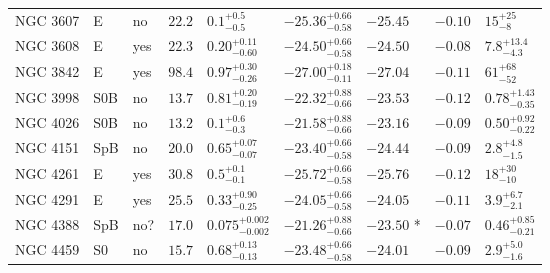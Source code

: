\begin{table*}
\begin{center}
\begin{tabular}{lllllllll}
NGC 3607  &  E  &  no   &  $22.2$  &  $0.1_{-0.5}^{+0.5}$   &  $-25.36_{-0.58}^{+0.66}$   &  $-25.45$   &  $-0.10$  &  $15_{-8}^{+25}$   \\ 
NGC 3608  &  E  &  yes   &  $22.3$  &  $0.20_{-0.60}^{+0.11}$   &  $-24.50_{-0.58}^{+0.66}$   &  $-24.50$   &  $-0.08$  &  $7.8_{-4.3}^{+13.4}$   \\ 
NGC 3842  &  E  &  yes   &  $98.4$  &  $0.97_{-0.26}^{+0.30}$   &  $-27.00_{-0.11}^{+0.18}$   &  $-27.04$   &  $-0.11$  &  $61_{-52}^{+68}$   \\ 
NGC 3998  &  S0B  &  no   &  $13.7$  &  $0.81_{-0.19}^{+0.20}$   &  $-22.32_{-0.66}^{+0.88}$   &  $-23.53$   &  $-0.12$  &  $0.78_{-0.35}^{+1.43}$   \\ 
NGC 4026  &  S0B  &  no   &  $13.2$  &  $0.1_{-0.3}^{+0.6}$   &  $-21.58_{-0.66}^{+0.88}$   &  $-23.16$   &  $-0.09$  &  $0.50_{-0.22}^{+0.92}$   \\ 
NGC 4151  &  SpB  &  no   &  $20.0$  &  $0.65_{-0.07}^{+0.07}$   &  $-23.40_{-0.58}^{+0.66}$   &  $-24.44$   &  $-0.09$  &  $2.8_{-1.5}^{+4.8}$   \\ 
NGC 4261  &  E  &  yes   &  $30.8$  &  $0.5_{-0.1}^{+0.1}$   &  $-25.72_{-0.58}^{+0.66}$   &  $-25.76$   &  $-0.12$  &  $18_{-10}^{+30}$   \\ 
NGC 4291  &  E  &  yes   &  $25.5$  &  $0.33_{-0.25}^{+0.90}$   &  $-24.05_{-0.58}^{+0.66}$   &  $-24.05$   &  $-0.11$  &  $3.9_{-2.1}^{+6.7}$   \\ 
NGC 4388  &  SpB  &  no?  &  $17.0$  &  $0.075_{-0.002}^{+0.002}$   &  $-21.26_{-0.66}^{+0.88}$   &  $-23.50$  *  &  $-0.07$  &  $0.46_{-0.21}^{+0.85}$   \\ 
NGC 4459  &  S0  &  no   &  $15.7$  &  $0.68_{-0.13}^{+0.13}$   &  $-23.48_{-0.58}^{+0.66}$   &  $-24.01$   &  $-0.09$  &  $2.9_{-1.6}^{+5.0}$   \\ 
\hline         
\end{tabular}   
\label{tab:sample} 
\end{center}    
\end{table*}    

